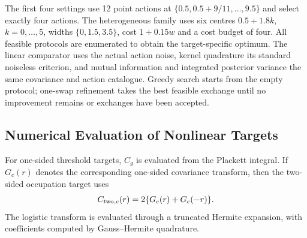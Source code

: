 The first four settings use 12 point actions at
$\{0.5,0.5+9/11,\ldots,9.5\}$ and select exactly four actions. The
heterogeneous family uses six centres $0.5+1.8k$, $k=0,\ldots,5$, widths
$\{0,1.5,3.5\}$, cost $1+0.15w$ and a cost budget of four. All feasible
protocols are enumerated to obtain the target-specific optimum. The linear
comparator uses the actual action noise, kernel quadrature its standard
noiseless criterion, and mutual information and integrated posterior variance
the same covariance and action catalogue. Greedy search starts from the empty
protocol; one-swap refinement takes the best feasible exchange until no
improvement remains or \numSwapRounds{} exchanges have been accepted.

\subsection{Numerical Evaluation of Nonlinear Targets}
\label{sec:appendix-numerical}

For one-sided threshold targets, $C_g$ is evaluated from the Plackett integral.
If $G_c(r)$ denotes the corresponding one-sided covariance transform, then the
two-sided occupation target uses
\begin{equation*}
C_{{\rm two},c}(r)=2\{G_c(r)+G_c(-r)\}.
\end{equation*}
The logistic transform is evaluated through a truncated Hermite expansion,
with coefficients computed by Gauss--Hermite quadrature. 
